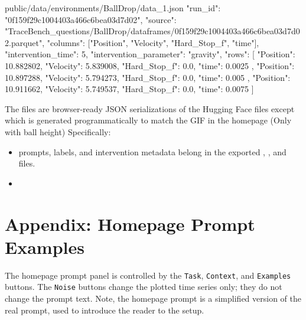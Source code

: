 \documentclass[11pt]{article}
\begin{document}
\label{sec:website-environment-data-json}
\begin{DocCode}
public/data/environments/BallDrop/data_1.json
{
  "run_id": "0f159f29c1004403a466c6bea03d7d02",
  "source": "TraceBench_questions/BallDrop/dataframes/0f159f29c1004403a466c6bea03d7d02.parquet",
  "columns": ["Position", "Velocity", "Hard_Stop_f", "time"],
  "intervention_time": 5,
  "intervention_parameter": "gravity",
  "rows": [
    {
      "Position": 10.882802,
      "Velocity": 5.839008,
      "Hard_Stop_f": 0.0,
      "time": 0.0025
    },
    {
      "Position": 10.897288,
      "Velocity": 5.794273,
      "Hard_Stop_f": 0.0,
      "time": 0.005
    },
    {
      "Position": 10.911662,
      "Velocity": 5.749537,
      "Hard_Stop_f": 0.0,
      "time": 0.0075
    }
  ]
}
\end{DocCode}
The  files are browser-ready JSON serializations of the Hugging Face files except  which is generated programmatically to match the GIF in the homepage (Only with ball height)
Specifically:
\begin{itemize}
  \item prompts, labels, and intervention metadata belong in the exported , , and  files.
  \item {}
\end{itemize}

\appendix
{}\label{sec:website-prompt-appendix}
\section*{Appendix: Homepage Prompt Examples}

The homepage prompt panel is controlled by the \texttt{Task}, \texttt{Context}, and \texttt{Examples} buttons.
The \texttt{Noise} buttons change the plotted time series only; they do not change the prompt text.
Note, the homepage prompt is a simplified version of the real prompt, used to introduce the reader to the setup. 
\end{document}
